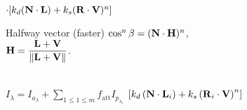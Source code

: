 \begin{compactdesc}
\begin{enumerate*}[label=\protect\circled{\arabic*},itemjoin=]
				\quad$\cdot \!\left[ k_d(\bm{\mathrm{N}}\cdot \bm{\mathrm{L}})+k_s(\bm{\mathrm{R}}\cdot \bm{\mathrm{V}})^n \right]\!$\\
			\item Halfway vector (faster)\hfill
				$\cos^n\beta=(\bm{\mathrm{N}}\cdot \bm{\mathrm{H}})^n$,\\
				$\bm{\mathrm{H}}=\displaystyle \frac{\bm{\mathrm{L}}+\bm{\mathrm{V}}}{\left\lVert \bm{\mathrm{L}}+\bm{\mathrm{V}} \right\rVert}$.\\
			\item[\lp{Multiple light sources}]\hfill\\
				$I_{\lambda}=I_{a_{\lambda}}+{\scriptstyle\sum_{1\leq 1\leq m}^{}}f_{\text{att}}I_{p_{\lambda_i}}$ $\left[ k_d\left( \bm{\mathrm{N}}\cdot \bm{\mathrm{L}}_i \right)+k_s\left( \bm{\mathrm{R}}_i\cdot \bm{\mathrm{V}} \right)^n \right]$
		\end{enumerate*}
\end{compactdesc}
